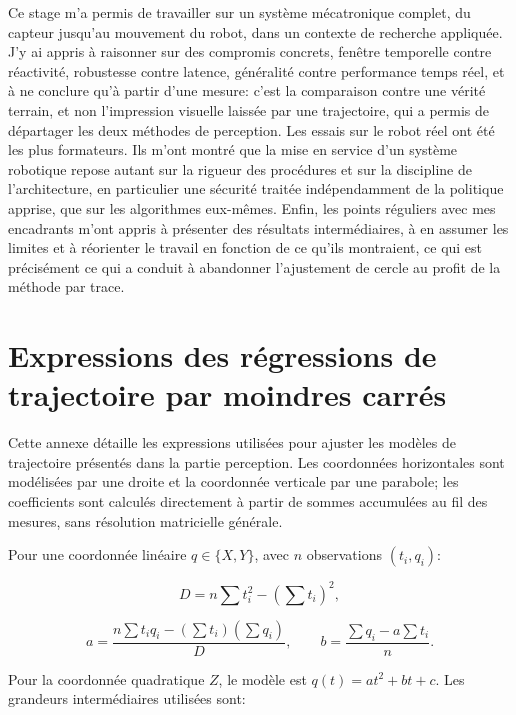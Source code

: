 \documentclass[a4paper,11pt]{report}
\begin{document}
Ce stage m'a permis de travailler sur un système mécatronique complet, du
capteur jusqu'au mouvement du robot, dans un contexte de recherche appliquée.
J'y ai appris à raisonner sur des compromis concrets, fenêtre temporelle contre
réactivité, robustesse contre latence, généralité contre performance temps réel,
et à ne conclure qu'à partir d'une mesure: c'est la comparaison contre une
vérité terrain, et non l'impression visuelle laissée par une trajectoire, qui a
permis de départager les deux méthodes de perception. Les essais sur le robot
réel ont été les plus formateurs. Ils m'ont montré que la mise en service d'un
système robotique repose autant sur la rigueur des procédures et sur la
discipline de l'architecture, en particulier une sécurité traitée indépendamment
de la politique apprise, que sur les algorithmes eux-mêmes. Enfin, les points
réguliers avec mes encadrants m'ont appris à présenter des résultats
intermédiaires, à en assumer les limites et à réorienter le travail en fonction
de ce qu'ils montraient, ce qui est précisément ce qui a conduit à abandonner
l'ajustement de cercle au profit de la méthode par trace.

\appendix

\chapter{Expressions des régressions de trajectoire par moindres carrés}
\label{ann:regressions}

Cette annexe détaille les expressions utilisées pour ajuster les modèles de trajectoire présentés dans la partie perception. Les coordonnées horizontales sont modélisées par une droite et la coordonnée verticale par une parabole; les coefficients sont calculés directement à partir de sommes accumulées au fil des mesures, sans résolution matricielle générale.

Pour une coordonnée linéaire \(q \in \{X,Y\}\), avec \(n\) observations \((t_i, q_i)\):

\begin{equation}
D = n \sum t_i^2 - \left(\sum t_i\right)^2,
\label{eq:mc-denominateur}
\end{equation}

\begin{equation}
a = \frac{n \sum t_i q_i - \left(\sum t_i\right)\left(\sum q_i\right)}{D},
\qquad
b = \frac{\sum q_i - a \sum t_i}{n}.
\label{eq:mc-lineaire}
\end{equation}

Pour la coordonnée quadratique \(Z\), le modèle est \(q(t) = a t^2 + b t + c\). Les grandeurs intermédiaires utilisées sont:
\end{document}
